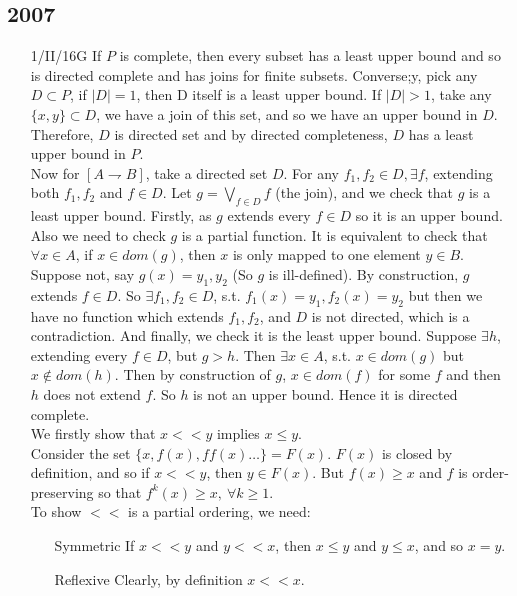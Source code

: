 \subsection{2007}
\begin{enumerate}
\item[1/II/16G] If $P$ is complete, then every subset has a least upper bound and so is directed complete and has joins for finite subsets. Converse;y, pick any $D \subset P$, if $|D|=1$, then D itself is a least upper bound. If $|D| >1$, take any $\{x,y\} \subset D$, we have a join of this set, and so we have an upper bound in $D$. Therefore, $D$ is directed set and by directed completeness, $D$ has a least upper bound in $P$.\\
    Now for $[A \rightharpoondown B]$, take a directed set $D$. For any $f_1,f_2 \in D, \exists f$, extending both $f_1, f_2$ and $f \in D$. Let $g=\bigvee_{f \in D}f$ (the join), and we check that $g$ is a least upper bound. Firstly, as $g$ extends every $f \in D$ so it is an upper bound. Also we need to check $g$ is a partial function. It is equivalent to check that $\forall x \in A$, if $x \in dom(g)$, then $x$ is only mapped to one element $y \in B$. Suppose not, say $g(x)=y_1,y_2$ (So $g$ is ill-defined). By construction, $g$ extends $f \in D$. So $\exists f_1,f_2 \in D$, s.t. $f_1(x)=y_1, f_2(x)=y_2$ but then we have no function which extends $f_1,f_2$, and $D$ is not directed, which is a contradiction. And finally, we check it is the least upper bound. Suppose $\exists h$, extending every $f \in D$, but $g > h$. Then $\exists x \in A$, s.t. $x \in dom(g)$ but $x \not \in dom(h)$. Then by construction of $g$, $x \in dom(f)$ for some $f$ and then $h$ does not extend $f$. So $h$ is not an upper bound. Hence it is directed complete.\\
    We firstly show that $x << y$ implies $x \le y$.\\
     Consider the set $\{x,f(x),ff(x) \ldots\}=F(x)$. $F(x)$ is closed by definition, and so if $x<<y$, then $y \in F(x)$. But $f(x) \ge x$ and $f$ is order-preserving so that $f^k(x) \ge x, ~\forall k \ge 1$.\\
    To show $<<$ is a partial ordering, we need:
    \begin{enumerate}
    \item[Symmetric] If $x << y$ and $y << x$, then $x \le y$ and $y \le x$, and so $x=y$.\\
    \item[Reflexive] Clearly, by definition $x << x$.\\

\end{enumerate}
\end{enumerate}
